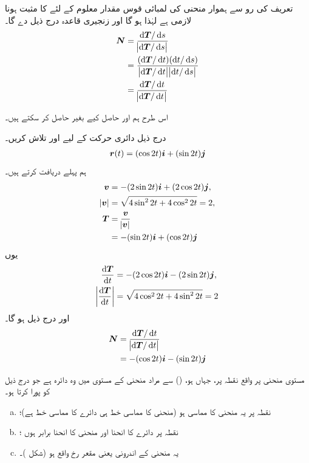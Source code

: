  تعریف کی رو سے  ہموار   منحنی   کی لمبائی قوس  مقدار معلوم  کے لئے    کا مثبت ہونا لازمی ہے لہٰذا  ہو گا   اور زنجیری قاعدہ درج ذیل دے گا۔
\begin{align}
\kvec{N}&=\frac{\dif\kvec{T}/\dif s}{\abs{\dif\kvec{T}/\dif s}}\nonumber\\
&=\frac{(\dif\kvec{T}/\dif t)(\dif t/\dif s)}{\abs{\dif\kvec{T}/\dif t}\abs{\dif t/\dif s}}\nonumber\\
&=\frac{\dif\kvec{T}/\dif t}{\abs{\dif\kvec{T}/\dif t}}
\end{align}

اس طرح ہم  اور  حاصل کیے بغیر  حاصل کر سکتے ہیں۔


درج ذیل دائری حرکت کے لیے  اور  تلاش کریں۔
\begin{align*}
{\ensuremath{{\boldsymbol{r}}}}(t)=(\cos 2t){\boldsymbol{i}}+(\sin 2t){\boldsymbol{j}}
\end{align*}
ہم پہلے  دریافت کرتے ہیں۔
\begin{align*}
{\ensuremath{{\boldsymbol{v}}}}&=-(2\sin 2t){\boldsymbol{i}}+(2\cos 2t){\boldsymbol{j}},\\
\abs{{{\boldsymbol{v}}}}&=\sqrt{4\sin^22t+4\cos^22t}=2,\\
{{\boldsymbol{T}}}&=\frac{{{\boldsymbol{v}}}}{\abs{{{\boldsymbol{v}}}}}\\
&=-(\sin 2t){\boldsymbol{i}}+(\cos 2t){\boldsymbol{j}}
\end{align*}
یوں
\begin{align*}
\frac{\dif \kvec{T}}{\dif t}&=-(2\cos 2t)\ai-(2\sin 2t)\aj,\\
\abs{\frac{\dif \kvec{T}}{\dif t}}&=\sqrt{4\cos^22t+4\sin^22t}=2
\end{align*}
اور درج ذیل ہو گا۔
\begin{align*}
\kvec{N}&=\frac{\dif \kvec{T}/\dif t}{\abs{\dif\kvec{T}/\dif t}}\\
&=-(\cos 2t)\ai-(\sin 2t)\aj
\end{align*}

مستوی منحنی  پر  واقع نقطہ    پر، جہاں  ہو،   () سے مراد    منحنی کے  مستوی میں وہ دائرہ ہے جو درج ذیل کو پورا  کرتا ہو۔
\begin{enumerate}[a.]
\item
نقطہ  پر یہ منحنی کا مماسی ہو (منحنی کا مماسی خط ہی دائرے  کا مماسی خط ہے)؛
\item
نقطہ  پر دائرے  کا  انحنا اور منحنی کا انحنا   برابر ہوں ؛
\item
یہ منحنی کے اندرونی یعنی مقعر رخ   واقع ہو (شکل )۔
\end{enumerate}

